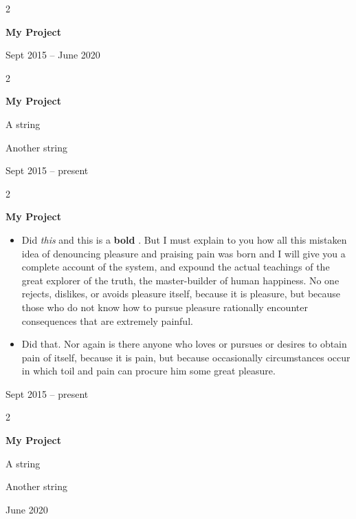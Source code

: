 \documentclass[10pt, letterpaper]{article}
\newenvironment{summary}{
    \begin{description}[
        topsep=0.10 cm,
        parsep=0.10 cm,
        partopsep=0pt,
        itemsep=0pt,
        leftmargin=0.4 cm + 10pt
    ]
}{
    \end{description}
} %
\newenvironment{highlights}{
    \begin{itemize}[
        topsep=0.10 cm,
        parsep=0.10 cm,
        partopsep=0pt,
        itemsep=0pt,
        leftmargin=0.4 cm + 10pt
    ]
}{
    \end{itemize}
} %
\newenvironment{twocolentry}[2][]{
    \onecolentry
    \def\secondColumn{#2}
    \setcolumnwidth{\fill, 4.5 cm}
    \begin{paracol}{2}
}{
    \switchcolumn \raggedleft \secondColumn
    \end{paracol}
    \endonecolentry
} %
\let\hrefWithoutArrow\href
\renewcommand{\href}[2]{\hrefWithoutArrow{#1}{\ifthenelse{\equal{#2}{}}{ }{#2 }\raisebox{.15ex}{\footnotesize \faExternalLink*}}}
\begin{document}
        \vspace{0.2 cm}

        \begin{twocolentry}{
            Sept 2015 – June 2020
        }
            \textbf{My Project}
        \end{twocolentry}


        \vspace{0.2 cm}

        \begin{twocolentry}{
            Sept 2015 – present
        }
            \textbf{My Project}
            \begin{summary}
                \item A string
                \item Another string
            \end{summary}
        \end{twocolentry}


        \vspace{0.2 cm}

        \begin{twocolentry}{
            Sept 2015 – present
        }
            \textbf{My Project}
            \begin{highlights}
                \item Did \textit{this} and this is a \textbf{bold} \href{https://example.com}{link}. But I must explain to you how all this mistaken idea of denouncing pleasure and praising pain was born and I will give you a complete account of the system, and expound the actual teachings of the great explorer of the truth, the master-builder of human happiness. No one rejects, dislikes, or avoids pleasure itself, because it is pleasure, but because those who do not know how to pursue pleasure rationally encounter consequences that are extremely painful.
                \item Did that. Nor again is there anyone who loves or pursues or desires to obtain pain of itself, because it is pain, but because occasionally circumstances occur in which toil and pain can procure him some great pleasure.
            \end{highlights}
        \end{twocolentry}


        \vspace{0.2 cm}

        \begin{twocolentry}{
            June 2020
        }
            \textbf{My Project}
            \begin{summary}
                \item A string
                \item Another string
            \end{summary}
        \end{twocolentry}
\end{document}
